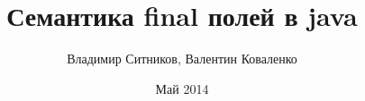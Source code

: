 \title[JMM: Final Fields Semantics]{Семантика final полей в java}
\author[Vladimir Sitnikov \& Valentin Kovalenko]{Владимир Ситников, Валентин Коваленко}
\date{Май 2014}

\ifrender
\begin{frame}
  \titlepage
\end{frame}
\fi
